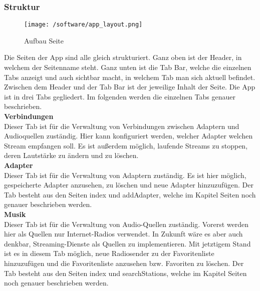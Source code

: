 \documentclass[11pt, twoside]{article}
\begin{document}
\subsubsection{Struktur}
\begin{figure}[H]
\texttt{[image: /software/app\_layout.png]}
\caption{Aufbau Seite}
\end{figure}
Die Seiten der App sind alle gleich strukturiert. Ganz oben ist der Header, in welchem der Seitenname steht. Ganz unten ist die Tab Bar, welche die einzelnen Tabs anzeigt und auch sichtbar macht, in welchem Tab man sich aktuell befindet. Zwischen dem Header und der Tab Bar ist der jeweilige Inhalt der Seite.
Die App ist in drei Tabs gegliedert. Im folgenden werden die einzelnen Tabs genauer beschrieben. \newline \\
\textbf{Verbindungen} \\
Dieser Tab ist für die Verwaltung von Verbindungen zwischen Adaptern und Audioquellen zuständig. Hier kann konfiguriert werden, welcher Adapter welchen Stream empfangen soll. Es ist außerdem möglich, laufende Streams zu stoppen, deren Lautstärke zu ändern und zu löschen. \newline \\
\textbf{Adapter} \\
Dieser Tab ist für die Verwaltung von Adaptern zuständig. Es ist hier möglich, gespeicherte Adapter anzusehen, zu löschen und neue Adapter hinzuzufügen. Der Tab besteht aus den Seiten index und addAdapter, welche im Kapitel Seiten noch genauer beschrieben werden.  \newline \\
\textbf{Musik} \\
Dieser Tab ist für die Verwaltung von Audio-Quellen zuständig. Vorerst werden hier als Quellen nur Internet-Radios verwendet. In Zukunft wäre es aber auch denkbar, Streaming-Dienste als Quellen zu implementieren. Mit jetztigem Stand ist es in diesem Tab möglich, neue Radiosender zu der Favoritenliste hinzuzufügen und die Favoritenliste anzusehen bzw. Favoriten zu löschen. Der Tab besteht aus den Seiten index und searchStations, welche im Kapitel Seiten noch genauer beschrieben werden. \newline \\
\end{document}
